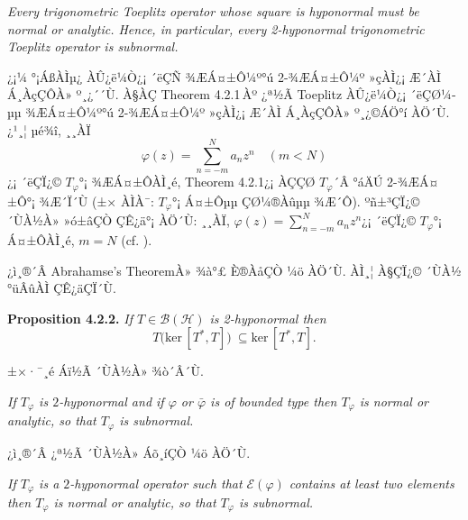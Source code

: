 \documentclass[12pt,a4paper,2sided]{article}
\begin{document}
\vspace{.2 cm}{\bf Theorem 4.2.1.} {\rm \cite{CuL1}}  {\sl Every
trigonometric Toeplitz operator whose square is hyponormal must be
normal or analytic. Hence, in particular, every 2-hyponormal
trigonometric Toeplitz operator is subnormal.}

\vspace{.2 cm} \cite{Cu1}¿¡¼­ °¡ÁßÀÌµ¿ ÀÛ¿ë¼Ò¿¡ ´ëÇÑ ¾ÆÁ¤±Ô¼º°ú
2-¾ÆÁ¤±Ô¼º »çÀÌ¿¡ Æ´ÀÌ Á¸ÀçÇÔÀ» º¸¿´´Ù. À§ÀÇ Theorem 4.2.1\,Àº ¿ª½Ã
Toeplitz ÀÛ¿ë¼Ò¿¡ ´ëÇØ¼­µµ  ¾ÆÁ¤±Ô¼º°ú 2-¾ÆÁ¤±Ô¼º »çÀÌ¿¡ Æ´ÀÌ
Á¸ÀçÇÔÀ» º¸¿©ÁÖ°í ÀÖ´Ù. ¿¹¸¦ µé¾î, ¸¸ÀÏ
$$
\varphi(z)=\sum_{n=-m}^N a_n z^n\quad (m<N)
$$
¿¡ ´ëÇÏ¿© $T_\varphi$°¡ ¾ÆÁ¤±ÔÀÌ¸é, Theorem 4.2.1¿¡ ÀÇÇØ
$T_\varphi$´Â °áÄÚ 2-¾ÆÁ¤±Ô°¡ ¾Æ´Ï´Ù (±× ÀÌÀ¯: $T_\varphi$°¡ Á¤±Ôµµ
ÇØ¼®Àûµµ ¾Æ´Ô). ºñ±³ÇÏ¿© ´ÙÀ½À» »ó±âÇÒ ÇÊ¿ä°¡ ÀÖ´Ù: ¸¸ÀÏ,
$\varphi(z)=\sum_{n=-m}^N a_n z^n$¿¡ ´ëÇÏ¿© $T_\varphi$°¡ Á¤±ÔÀÌ¸é,
$m=N$ (cf. \cite{FL1}).

\vspace{.2 cm} ¿ì¸®´Â Abrahamse's TheoremÀ» ¾à°£ È®ÀåÇÒ ¼ö ÀÖ´Ù.
ÀÌ¸¦ À§ÇÏ¿© ´ÙÀ½ °üÂûÀÌ ÇÊ¿äÇÏ´Ù.


\newpage{}

\vspace{.8 cm}

{\bf Proposition 4.2.2.} {\rm \cite{CuL2}} {\sl If
$T\in\mathcal{B(H)}$ is 2-hyponormal then
\begin{equation}\label{4.2.1}
T\bigl(\text{ker}\,[T^*,T]\bigr)\ \subseteq \text{ker}\,[T^*,T].
\end{equation}}

±×·¯¸é  Áï½Ã ´ÙÀ½À» ¾ò´Â´Ù.

\vspace{.2 cm}{\bf Corollary 4.2.3.} {\sl If $T_\varphi$ is
$2$-hyponormal and if $\varphi$ or $\bar\varphi$ is of bounded type
then $T_\varphi$ is normal or analytic, so that $T_\varphi$ is
subnormal.}  \vspace{.2 cm}

¿ì¸®´Â ¿ª½Ã ´ÙÀ½À» Áõ¸íÇÒ ¼ö ÀÖ´Ù.

\vspace{.2 cm}{\bf Corollary 4.2.4.} {\sl If $T_\varphi$ is a
$2$-hyponormal operator such that $\mathcal{E}(\varphi)$ contains at
least two elements then $T_\varphi$ is normal or analytic, so that
$T_\varphi$ is subnormal.}
\vspace{.2 cm}
\end{document}
